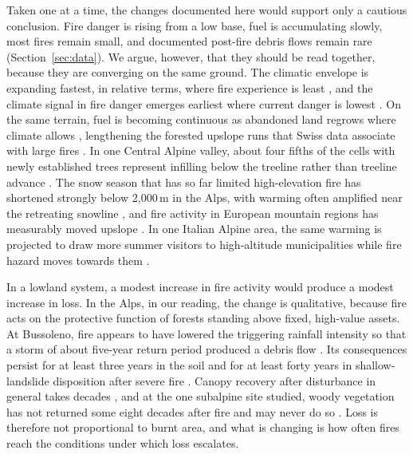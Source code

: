 \documentclass[11pt,a4paper]{article}
\begin{document}
Taken one at a time, the changes documented here would support only a cautious conclusion. Fire danger is rising from a low base, fuel is accumulating slowly, most fires remain small, and documented post-fire debris flows remain rare (Section~\ref{sec:data}). We argue, however, that they should be read together, because they are converging on the same ground. The climatic envelope is expanding fastest, in relative terms, where fire experience is least \citep{gerberding_mapping_2025}, and the climate signal in fire danger emerges earliest where current danger is lowest \citep{miller_climate_2024}. On the same terrain, fuel is becoming continuous as abandoned land regrows where climate allows \citep{garbarino_contrasting_2020}, lengthening the forested upslope runs that Swiss data associate with large fires \citep{conedera_linking_2024}. In one Central Alpine valley, about four fifths of the cells with newly established trees represent infilling below the treeline rather than treeline advance \citep{frei_evidence_2023}. The snow season that has so far limited high-elevation fire has shortened strongly below 2{,}000\,m in the Alps, with warming often amplified near the retreating snowline \citep{rangwala_climate_2012, pepin_climate_2022}, and fire activity in European mountain regions has measurably moved upslope \citep{beloiu_climatedriven_2026}. In one Italian Alpine area, the same warming is projected to draw more summer visitors to high-altitude municipalities while fire hazard moves towards them \citep{pede_mountain_2022}.

In a lowland system, a modest increase in fire activity would produce a modest increase in loss. In the Alps, in our reading, the change is qualitative, because fire acts on the protective function of forests standing above fixed, high-value assets. At Bussoleno, fire appears to have lowered the triggering rainfall intensity so that a storm of about five-year return period produced a debris flow \citep{laporta_postwildfire_2025}. Its consequences persist for at least three years in the soil \citep{negri_wildfire_2026} and for at least forty years in shallow-landslide disposition after severe fire \citep{gehring_shallow_2019}. Canopy recovery after disturbance in general takes decades \citep{stritih_alternative_2023}, and at the one subalpine site studied, woody vegetation has not returned some eight decades after fire and may never do so \citep{degiuli_arrested_2024}. Loss is therefore not proportional to burnt area, and what is changing is how often fires reach the conditions under which loss escalates.
\end{document}
